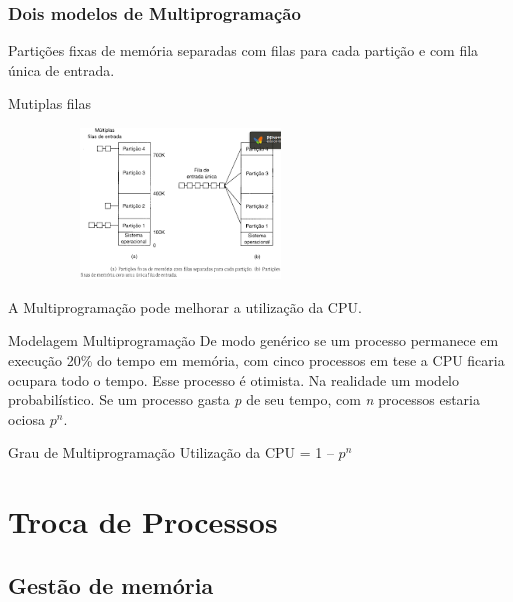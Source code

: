 \documentclass[11pt]{beamer}
\begin{document}
\begin{frame}\frametitle{ Dois modelos de Multiprogramação}
  Partições fixas de memória separadas com filas para cada partição e com fila única de entrada.
\begin{exampleblock}{ Mutiplas filas}
  \pause
  \begin{figure}[h]
    \includegraphics[width=70mm, height=40mm]{Figuras/multifilasParticap.png}\\
  \end{figure}
\end{exampleblock}
  A Multiprogramação pode melhorar a utilização da CPU.
\end{frame}


\begin{frame}{ Modelagem Multiprogramação}
\pause
  De modo genérico se um processo permanece em execução 20\% do tempo em memória, 
  com cinco processos em tese a CPU ficaria ocupara todo o tempo. Esse processo é otimista.
  Na realidade um modelo probabilístico. 
  Se um processo gasta \textit{p} de seu tempo, com \textit{n} processos estaria ociosa 
  \textit{$p^{n}$}.
\pause
\begin{exampleblock}{Grau de Multiprogramação}
 Utilização da CPU = 1 -- \textit{$p^{n}$}
\end{exampleblock}

 
\end{frame}




\section{ Troca de Processos}
\subsection*{ Gestão de memória}
\end{document}
